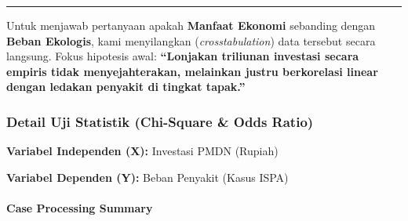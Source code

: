 \documentclass[
]{article}
\begin{document}
\begin{center}\rule{0.5\linewidth}{0.5pt}\end{center}

Untuk menjawab pertanyaan apakah \textbf{Manfaat Ekonomi} sebanding
dengan \textbf{Beban Ekologis}, kami menyilangkan
(\emph{crosstabulation}) data tersebut secara langsung. Fokus hipotesis
awal: \textbf{``Lonjakan triliunan investasi secara empiris tidak
menyejahterakan, melainkan justru berkorelasi linear dengan ledakan
penyakit di tingkat tapak.''}

\subsubsection{Detail Uji Statistik (Chi-Square \& Odds
Ratio)}\label{detail-uji-statistik-chi-square-odds-ratio}

\textbf{Variabel Independen (X):} Investasi PMDN (Rupiah)

\textbf{Variabel Dependen (Y):} Beban Penyakit (Kasus ISPA)

\paragraph{Case Processing Summary}\label{case-processing-summary}
\end{document}
